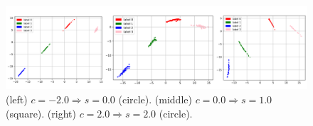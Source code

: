 \documentclass[final]{cvpr}
\begin{document}
\begin{figure}[t]
	\begin{center}
		\includegraphics[width=1.0\linewidth]{./figs/toy/with_style/combined_reverse_sample.png}
	\end{center}
	\caption{(left) $c = -2.0 \Rightarrow s = 0.0$ (circle). (middle) $c = 0.0 \Rightarrow s = 1.0$ (square). (right) $c = 2.0 \Rightarrow s = 2.0$ (circle).}
	\label{fig:latent}
\end{figure}






{\small


}
\end{document}

